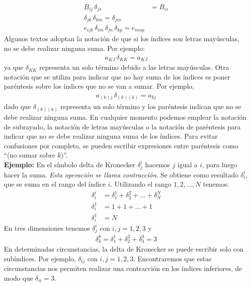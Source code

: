 \begin{align*}
B_{ij} \, \delta_{js} &= B_{is} \\[0.5em]
\delta_{jk} \, \delta_{km} = \delta_{jm} \\[0.5em]
e_{ijk} \, \delta_{im} \, \delta_{jn} \, \delta_{kp} = e_{mnp}
\end{align*}
Algunos textos adoptan la notación de que si los índices son letras mayúsculas, no se debe realizar ninguna suma. Por ejemplo:
\begin{align*}
a_{KJ} \, \delta_{KK} = a_{KJ}
\end{align*}
ya que $\delta_{KK}$ representa un solo término debido a las letras mayúsculas. Otra notación que se utiliza para indicar que no hay suma de los índices es poner paréntesis sobre los índices que no se van a sumar. Por ejemplo,
\begin{align*}
a_{(k) j} \, \delta_{(k) (k)} = a_{kj}
\end{align*}
dado que $\delta_{(k) (k)}$ representa un solo término y los paréntesis indican que no se debe realizar ninguna suma. En cualquier momento podemos emplear la notación de subrayado, la notación de letras mayúsculas o la notación de paréntesis para indicar que no se debe realizar ninguna suma de los índices. Para evitar confusiones por completo, se pueden escribir expresiones entre paréntesis como \enquote{(no sumar sobre $k$)}.
\\[0.5em]
\noindent
\textbf{Ejemplo: } En el símbolo delta de Kronecker $\delta_{j}^{i}$ hacemos $j$ igual a $i$, para luego hacer la suma. \emph{Esta operación se llama contracción}. Se obtiene como resultado $\delta_{i}^{i}$, que se suma en el rango del índice $i$. Utilizando el rango $1, 2, \ldots, N$ tenemos:
\begin{align*}
\delta_{i}^{i} &= \delta_{1}^{1} + \delta_{2}^{2} + \ldots + \delta_{N}^{N} \\[0.5em]
\delta_{i}^{1} &= 1 + 1 + \ldots +  1 \\[0.em]
\delta_{i}^{1} &= N
\end{align*}
En tres dimensiones tenemos $\delta_{j}^{i}$ con $i, j = 1, 2, 3$ y
\begin{align*}
\delta_{k}^{k} = \delta_{1}^{1} + \delta_{2}^{2} + \delta_{3}^{3} = 3
\end{align*}
En determinadas circunstancias, la delta de Kronecker se puede escribir solo con subíndices. Por ejemplo, $\delta_{ij}$ con $i, j = 1, 2, 3$. Encontraremos que estas circunstancias nos permiten realizar una contracción en los índices inferiores, de modo que $\delta_{ii} = 3$.
